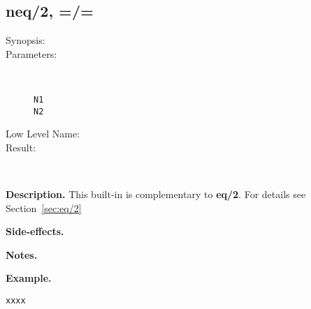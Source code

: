 %
%
%
\subsection{neq/2, =/=}

\begin{description}
\item[Synopsis:]
	{\tt }
\item[Parameters:]\ \\[-0.5cm]
	\begin{description}
	\item[{\tt N1}]
	\item[{\tt N2}]
	\end{description}
\item[Low Level Name:]
	{\tt }
\item[Result:]\ \\
\end{description}

\vspace*{0.5cm}
\noindent
{\bf Description.}
This built-in is complementary to {\bf eq/2}. For details see
Section~\ref{sec:eq/2}




\vspace*{0.5cm}
\noindent
{\bf Side-effects.}

\vspace*{0.5cm}
\noindent
{\bf Notes.}

\vspace*{0.5cm}
\noindent
{\bf Example.}
\begin{verbatim}
xxxx
\end{verbatim}


